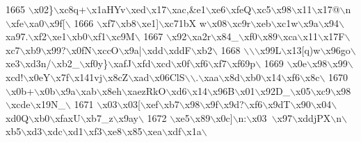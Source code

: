 \begin{DoxyCode}
{1665 \textcolor{stringliteral}{\(\backslash\)x02\}\(\backslash\)xc8q+\(\backslash\)x1aHYv\(\backslash\)xed\(\backslash\)x17\(\backslash\)xac,&e1\(\backslash\)xe6\(\backslash\)xfeQ\(\backslash\)xc5\(\backslash\)x98\(\backslash\)x11\(\backslash\)x17@\(\backslash\)n\(\backslash\)xfe\(\backslash\)xa0\(\backslash\)x9f[\(\backslash\)}
1666 \textcolor{stringliteral}{\(\backslash\)xf7\(\backslash\)xb8\(\backslash\)xe1]\(\backslash\)xc71bX w\(\backslash\)x08\(\backslash\)xc9r\(\backslash\)xeb\(\backslash\)xc1w\(\backslash\)x9a\(\backslash\)x94\(\backslash\)xa97.\(\backslash\)xf2\(\backslash\)xe1\(\backslash\)xb0\(\backslash\)xf1\(\backslash\)xc9M\(\backslash\)}
1667 \textcolor{stringliteral}{\(\backslash\)x92\(\backslash\)xa2r\(\backslash\)x84\_\(\backslash\)xf0\(\backslash\)x89\(\backslash\)xca\(\backslash\)x11\(\backslash\)x17F\(\backslash\)xc7\(\backslash\)xb9\(\backslash\)x99?\(\backslash\)x0fN\(\backslash\)xccO\(\backslash\)x9a|\(\backslash\)xdd\(\backslash\)xddF\(\backslash\)xb2\(\backslash\)}
1668 \textcolor{stringliteral}{\(\backslash\)\(\backslash\)\(\backslash\)x99L\(\backslash\)x13[q)w\(\backslash\)x96go\(\backslash\)xe3\(\backslash\)xd3n/\(\backslash\)xb2\_\(\backslash\)xf0y\}\(\backslash\)xafJ\(\backslash\)xfd\(\backslash\)xcd\(\backslash\)x0f\(\backslash\)xf6\(\backslash\)xf7\(\backslash\)xf69p\(\backslash\)}
1669 \textcolor{stringliteral}{\(\backslash\)x0e\(\backslash\)x98\(\backslash\)x99\(\backslash\)xcd!\(\backslash\)x0eY\(\backslash\)x7f\(\backslash\)x141vj\(\backslash\)x8cZ\(\backslash\)xad\(\backslash\)x06ClS\(\backslash\)\(\backslash\).\(\backslash\)xaa\(\backslash\)x8d\(\backslash\)xb0\(\backslash\)x14\(\backslash\)xf6\(\backslash\)x8c\(\backslash\)}
1670 \textcolor{stringliteral}{\(\backslash\)x0b+\(\backslash\)x0b\(\backslash\)x9a\(\backslash\)xab\(\backslash\)x8eh\(\backslash\)xaezRkO\(\backslash\)xd6\(\backslash\)x14\(\backslash\)x96B\(\backslash\)x01\(\backslash\)x92D\_\(\backslash\)x05\(\backslash\)xc9\(\backslash\)x98\(\backslash\)xcde\(\backslash\)x19N\_\(\backslash\)}
1671 \textcolor{stringliteral}{\(\backslash\)x03\(\backslash\)x03[\(\backslash\)xef\(\backslash\)xb7\(\backslash\)x98\(\backslash\)x9f\(\backslash\)x9d?\(\backslash\)xf6\(\backslash\)x9dT\(\backslash\)x90\(\backslash\)x04\(\backslash\)xd0Q\(\backslash\)xb0\(\backslash\)xfaxU\(\backslash\)xb7\_z\(\backslash\)x9ay\(\backslash\)}
1672 \textcolor{stringliteral}{\(\backslash\)xe5\(\backslash\)x89\(\backslash\)x0c]\(\backslash\)n:\(\backslash\)x03~\(\backslash\)x97\(\backslash\)xddjPX\(\backslash\)n\(\backslash\)xb5\(\backslash\)xd3\(\backslash\)xdc\(\backslash\)xd1\(\backslash\)xf3\(\backslash\)xe8\(\backslash\)x85\(\backslash\)xea\(\backslash\)xdf\(\backslash\)x1a\(\backslash\)}
}
\end{DoxyCode}
